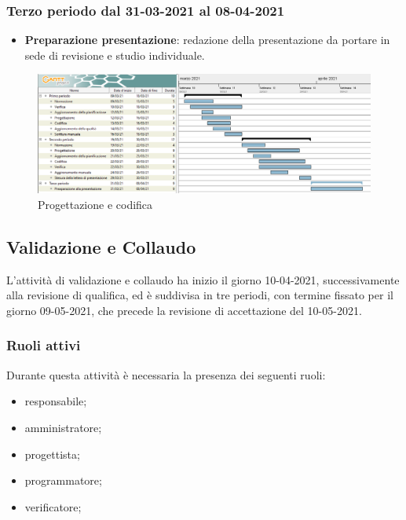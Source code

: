 \documentclass[]{article}
\begin{document}
	\subsubsection{Terzo periodo dal 31-03-2021 al 08-04-2021}
	\begin{itemize}
	\item \textbf{Preparazione presentazione}: redazione della presentazione da portare in sede di revisione e
	studio individuale.
	\end{itemize}

	\newpage
	\begin{figure}[h!]
	\includegraphics[width=1.7\textwidth, left]{images/4_Progettazione_e_codifica.png}
	\caption{Progettazione e codifica}
	\end{figure}
	
	\newpage
	
	\newpage

	\subsection{Validazione e Collaudo}
	L’attività di validazione e collaudo ha inizio il giorno 10-04-2021, successivamente alla revisione di
	qualifica, ed è suddivisa in tre periodi, con termine fissato per il giorno 09-05-2021, che precede la
	revisione di accettazione del 10-05-2021.
	
	\subsubsection{Ruoli attivi}
	Durante questa attività è necessaria la presenza dei seguenti ruoli:
	\begin{itemize}
		\item responsabile;
		\item amministratore;
		\item progettista;
		\item programmatore;
		\item verificatore;
	\end{itemize}
\end{document}

